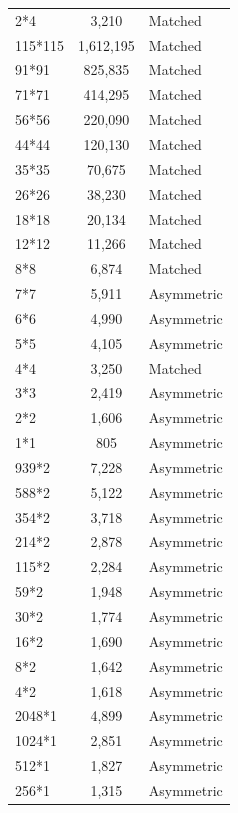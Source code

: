 \documentclass[conference]{IEEEtran}
\begin{document}
\begin{table}[ht]
\begin{tabular}{lcl}
2*4        & 3,210           & Matched \\
115*115    & 1,612,195       & Matched \\
91*91      & 825,835         & Matched \\
71*71      & 414,295         & Matched \\
56*56      & 220,090         & Matched \\
44*44      & 120,130         & Matched \\
35*35      & 70,675          & Matched \\
26*26      & 38,230          & Matched \\
18*18      & 20,134          & Matched \\
12*12      & 11,266          & Matched \\
8*8        & 6,874           & Matched \\
7*7        & 5,911           & Asymmetric \\
6*6        & 4,990           & Asymmetric \\
5*5        & 4,105           & Asymmetric \\
4*4        & 3,250           & Matched \\
3*3        & 2,419           & Asymmetric \\
2*2        & 1,606           & Asymmetric \\
1*1        & 805             & Asymmetric \\
939*2      & 7,228           & Asymmetric \\
588*2      & 5,122           & Asymmetric \\
354*2      & 3,718           & Asymmetric \\
214*2      & 2,878           & Asymmetric \\
115*2      & 2,284           & Asymmetric \\
59*2       & 1,948           & Asymmetric \\
30*2       & 1,774           & Asymmetric \\
16*2       & 1,690           & Asymmetric \\
8*2        & 1,642           & Asymmetric \\
4*2        & 1,618           & Asymmetric \\
2048*1     & 4,899           & Asymmetric \\
1024*1     & 2,851           & Asymmetric \\
512*1      & 1,827           & Asymmetric \\
256*1      & 1,315           & Asymmetric \\

\end{tabular}
\end{table}
\end{document}
